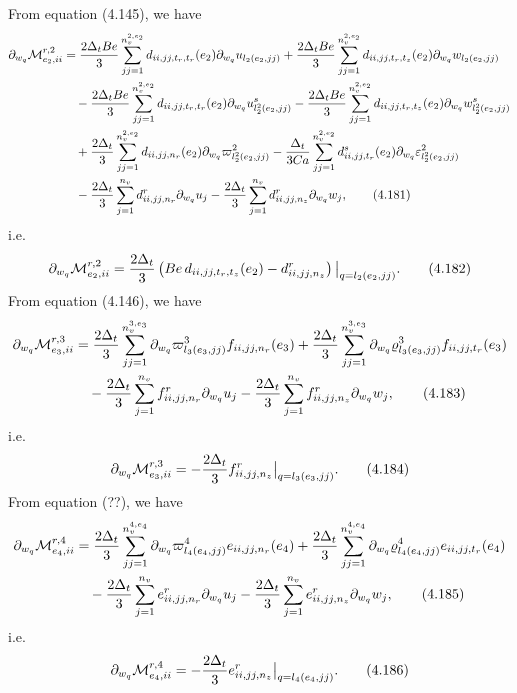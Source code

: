 \documentclass{article}
\begin{document}
From equation (4.145), we have
\begin{align}
\partial_{w_q}\mathcal{M}_{e_2,ii}^{r,2} &= \frac{2\Delta_t Be}{3} \sum_{jj=1}^{n_v^{2,e_2}} d_{ii,jj,t_r,t_r}(e_2) \partial_{w_q} u_{l_2(e_2,jj)} 
+ \frac{2\Delta_t Be}{3} \sum_{jj=1}^{n_v^{2,e_2}} d_{ii,jj,t_r,t_z}(e_2) \partial_{w_q} w_{l_2(e_2,jj)} \nonumber\\
&\quad - \frac{2\Delta_t Be}{3} \sum_{jj=1}^{n_v^{2,e_2}} d_{ii,jj,t_r,t_r}(e_2) \partial_{w_q} u_{l_2^2(e_2,jj)}^s 
- \frac{2\Delta_t Be}{3} \sum_{jj=1}^{n_v^{2,e_2}} d_{ii,jj,t_r,t_z}(e_2) \partial_{w_q} w_{l_2^2(e_2,jj)}^s \nonumber\\
&\quad + \frac{2\Delta_t}{3} \sum_{jj=1}^{n_v^{2,e_2}} d_{ii,jj,n_r}(e_2) \partial_{w_q} \varpi_{l_2^2(e_2,jj)}^2 
- \frac{\Delta_t}{3Ca} \sum_{jj=1}^{n_v^{2,e_2}} d_{ii,jj,t_r}^s(e_2) \partial_{w_q} \varepsilon_{l_2^2(e_2,jj)}^2 \nonumber\\
&\quad - \frac{2\Delta_t}{3} \sum_{j=1}^{n_v} d_{ii,jj,n_r}^r \partial_{w_q} u_j 
- \frac{2\Delta_t}{3} \sum_{j=1}^{n_v} d_{ii,jj,n_z}^r \partial_{w_q} w_j, \tag{4.181}
\end{align}
i.e.
\begin{equation}
\partial_{w_q}\mathcal{M}_{e_2,ii}^{r,2} = \frac{2\Delta_t}{3} \left( Be\, d_{ii,jj,t_r,t_z}(e_2) - d_{ii,jj,n_z}^r \right) \big|_{q=l_2(e_2,jj)}. \tag{4.182}
\end{equation}
From equation (4.146), we have
\begin{align}
\partial_{w_q}\mathcal{M}_{e_3,ii}^{r,3} &= \frac{2\Delta_t}{3} \sum_{jj=1}^{n_v^{3,e_3}} \partial_{w_q} \varpi_{l_3(e_3,jj)}^3 f_{ii,jj,n_r}(e_3) 
+ \frac{2\Delta_t}{3} \sum_{jj=1}^{n_v^{3,e_3}} \partial_{w_q} \varrho_{l_3(e_3,jj)}^3 f_{ii,jj,t_r}(e_3) \nonumber\\
&\quad - \frac{2\Delta_t}{3} \sum_{j=1}^{n_v} f_{ii,jj,n_r}^r \partial_{w_q} u_j 
- \frac{2\Delta_t}{3} \sum_{j=1}^{n_v} f_{ii,jj,n_z}^r \partial_{w_q} w_j, \tag{4.183}
\end{align}
i.e.
\begin{equation}
\partial_{w_q}\mathcal{M}_{e_3,ii}^{r,3} = -\frac{2\Delta_t}{3} f_{ii,jj,n_z}^r \big|_{q=l_3(e_3,jj)}. \tag{4.184}
\end{equation}
From equation (??), we have
\begin{align}
\partial_{w_q}\mathcal{M}_{e_4,ii}^{r,4} &= \frac{2\Delta_t}{3} \sum_{jj=1}^{n_v^{4,e_4}} \partial_{w_q} \varpi_{l_4(e_4,jj)}^4 e_{ii,jj,n_r}(e_4) 
+ \frac{2\Delta_t}{3} \sum_{jj=1}^{n_v^{4,e_4}} \partial_{w_q} \varrho_{l_4(e_4,jj)}^4 e_{ii,jj,t_r}(e_4) \nonumber\\
&\quad - \frac{2\Delta_t}{3} \sum_{j=1}^{n_v} e_{ii,jj,n_r}^r \partial_{w_q} u_j 
- \frac{2\Delta_t}{3} \sum_{j=1}^{n_v} e_{ii,jj,n_z}^r \partial_{w_q} w_j, \tag{4.185}
\end{align}
i.e.
\begin{equation}
\partial_{w_q}\mathcal{M}_{e_4,ii}^{r,4} = -\frac{2\Delta_t}{3} e_{ii,jj,n_z}^r \big|_{q=l_4(e_4,jj)}. \tag{4.186}
\end{equation}
\end{document}
